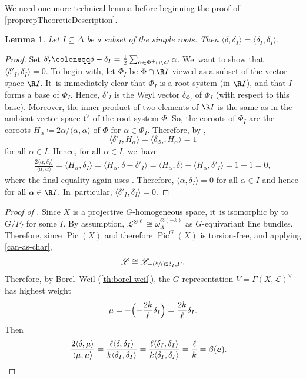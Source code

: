 \documentclass[JEP,XML,SOM,Unicode,published]{cedram}
\newcommand{\Psfrac}[2]{(\sfrac{#1}{#2})}
\newcommand{\bme}{{\boldsymbol{e}}}
\newtheorem{lem}[thm]{Lemma}
\DeclareMathOperator{\Pic}{Pic}
\begin{document}
We need one more technical lemma before beginning the proof of \cref{prop:repTheoreticDescription}.

\begin{lem}
Let $I\subseteq \Delta$ be a subset of the simple roots. Then $\langle\delta,\delta_I\rangle = \langle\delta_I, \delta_I\rangle$.
\end{lem}

\begin{proof}
Set $\delta_I' \coloneqq \delta - \delta_I = \frac{1}{2}\sum_{\alpha\in \Phi^+\cap \Z I} \alpha$. We~want to show that $\langle\delta'_I, \delta_I\rangle=0$. To begin with, let $\Phi_I$ be $\Phi\cap \R I$ viewed as a subset of the vector space $\R I$. It~is immediately clear that $\Phi_I$ is a root system (in $\R I$), and that $I$ forms a base of $\Phi_I$. Hence, $\delta'_I$ is the Weyl vector $\delta_{\Phi_I}$ of $\Phi_I$ (with respect to this base). Moreover, the inner product of two elements of $\R I$ is the same as in the ambient vector space $\mathfrak{t}^\vee$ of the root system $\Phi$. So, the coroots of $\Phi_I$ are the coroots $H_\alpha\coloneqq 2\alpha/\langle\alpha,\alpha\rangle$ of $\Phi$ for $\alpha\in \Phi_I$. Therefore, by \cite[Prop.\,8.38]{Hal15},
\[
\langle\delta'_I, H_\alpha\rangle = \langle\delta_{\Phi_I}, H_\alpha\rangle = 1
\]
for all $\alpha\in I$. Hence, for all $\alpha\in I$, we~have
\begin{align*}
\frac{2\langle \alpha, \delta_I\rangle}{\langle\alpha,\alpha\rangle}
= \langle H_\alpha, \delta_I\rangle
= \langle H_\alpha, \delta - \delta'_I\rangle
= \langle H_\alpha, \delta\rangle - \langle H_\alpha, \delta'_I\rangle
= 1-1 = 0,
\end{align*}
where the final equality again uses \cite[Prop.\,8.38]{Hal15}. Therefore, $\langle\alpha, \delta_I\rangle=0$ for all $\alpha\in I$ and hence for all $\alpha\in \R I$. In~particular, $\langle \delta'_I, \delta_I\rangle=0$.
\end{proof}

\begin{proof}[Proof of ]
Since $X$ is a projective $G$-homogeneous space, it~is isomorphic by  to $G/P_I$ for some $I$. By assumption, $\mathscr{L}^{\otimes \ell}\cong \omega_X^{\otimes (-k)}$ as $G$-equivariant line bundles. Therefore, since $\Pic(X)$ and therefore $\Pic^G(X)$ is torsion-free, and applying \cref{can-as-char},
\begin{equation*}
\mathscr{L} \cong \mathscr{L}_{-\Psfrac{k}{\ell}2\delta_I, P}.
\end{equation*}
Therefore, by Borel--Weil (\cref{th:borel-weil}), the $G$-representation $V=\Gamma(X, \mathscr{L})^\vee$ has highest weight
\[
\mu=-\Bigl(-\frac{2k}{\ell}\delta_I\Bigr)=\frac{2k}{\ell}\delta_I.
\]
Then
\begin{align*}
\frac{2\langle\delta, \mu\rangle}{\langle\mu,\mu\rangle}
&= \frac{\ell\langle \delta, \delta_I\rangle}{k\langle\delta_I, \delta_I\rangle}
= \frac{\ell\langle \delta_I, \delta_I\rangle}{k\langle\delta_I, \delta_I\rangle}
= \frac{\ell}{k}
= \beta(\bme). \qedhere
\end{align*}
\end{proof}
\end{document}
